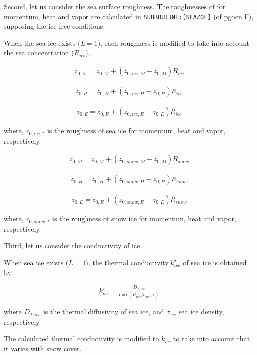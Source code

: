 Second, let us consider the sea surface roughness. The roughnesses of
for momentum, heat and vapor are calculated in
\texttt{SUBROUTINE:{[}SEAZ0F{]}} (of pgocn.F), supposing the ice-free
conditions.

When the sea ice exists (\(L=1\)), each roughness is modified to take
into account the sea concentration (\(R_{ice}\)),

\begin{eqnarray}
    z_{0,M} = z_{0,M} + ( z_{0,ice,M} - z_{0,M})  R_{ice}
\end{eqnarray}

\begin{eqnarray}
    z_{0,H} = z_{0,H} + ( z_{0,ice,H} - z_{0,H})  R_{ice}
\end{eqnarray}

\begin{eqnarray}
    z_{0,E} = z_{0,E} + ( z_{0,ice,E} - z_{0,E})  R_{ice}
\end{eqnarray}

where, \(r_{0,ice,*}\) is the roughness of sea ice for momentum, heat
and vapor, respectively.

\begin{eqnarray}
    z_{0,M} = z_{0,M} + ( z_{0,snow,M} - z_{0,M})  R_{snow}
\end{eqnarray}

\begin{eqnarray}
    z_{0,H} = z_{0,H} + ( z_{0,snow,H} - z_{0,H})  R_{snow}
\end{eqnarray}

\begin{eqnarray}
    z_{0,E} = z_{0,E} + ( z_{0,snow,E} - z_{0,E})  R_{snow}
\end{eqnarray}

where, \(r_{0,snow,*}\) is the roughness of snow ice for momentum, heat
and vapor, respectively.

Third, let us consider the conductivity of ice.

When sea ice exists (\(L=1\)), the thermal conductivity
\(k_{ice}^\star\) of sea ice is obtained by

\begin{eqnarray}
k_{ice}^\star = \frac{D_{f,ice}}{\mathrm{max}(R_{ice}/\sigma_{ice}, \epsilon)}
\end{eqnarray}

where \(D_{f,ice}\) is the thermal diffusivity of sea ice, and
\(\sigma_{ice}\) sea ice density, respectively.

The calculated thermal conductivity is modified to \(k_{ice}\) to take
into account that it varies with snow cover.

